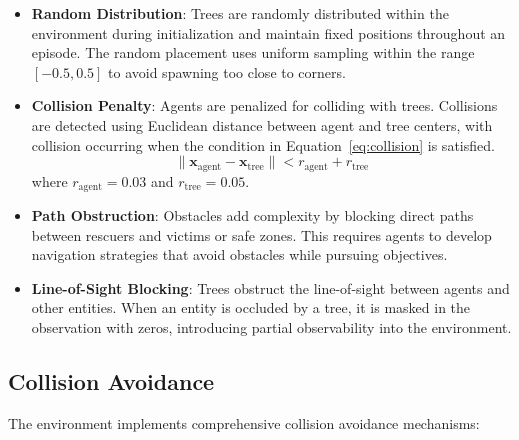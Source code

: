 \documentclass[11pt,a4paper]{article}
\begin{document}
\begin{itemize}
    \item \textbf{Random Distribution}: Trees are randomly distributed within the environment during initialization and maintain fixed positions throughout an episode.
    The random placement uses uniform sampling within the range $[-0.5, 0.5]$ to avoid spawning too close to corners.

    \item \textbf{Collision Penalty}: Agents are penalized for colliding with trees.
    Collisions are detected using Euclidean distance between agent and tree centers, with collision occurring when the condition in Equation~\ref{eq:collision} is satisfied.
    \begin{equation}
    \label{eq:collision}
    \|\mathbf{x}_{\text{agent}} - \mathbf{x}_{\text{tree}}\| < r_{\text{agent}} + r_{\text{tree}}
    \end{equation}
    where $r_{\text{agent}} = 0.03$ and $r_{\text{tree}} = 0.05$.

    \item \textbf{Path Obstruction}: Obstacles add complexity by blocking direct paths between rescuers and victims or safe zones.
    This requires agents to develop navigation strategies that avoid obstacles while pursuing objectives.

    \item \textbf{Line-of-Sight Blocking}: Trees obstruct the line-of-sight between agents and other entities.
    When an entity is occluded by a tree, it is masked in the observation with zeros, introducing partial observability into the environment.
\end{itemize}

\subsection{Collision Avoidance}
\label{subsec:collision_avoidance}

The environment implements comprehensive collision avoidance mechanisms:
\end{document}

